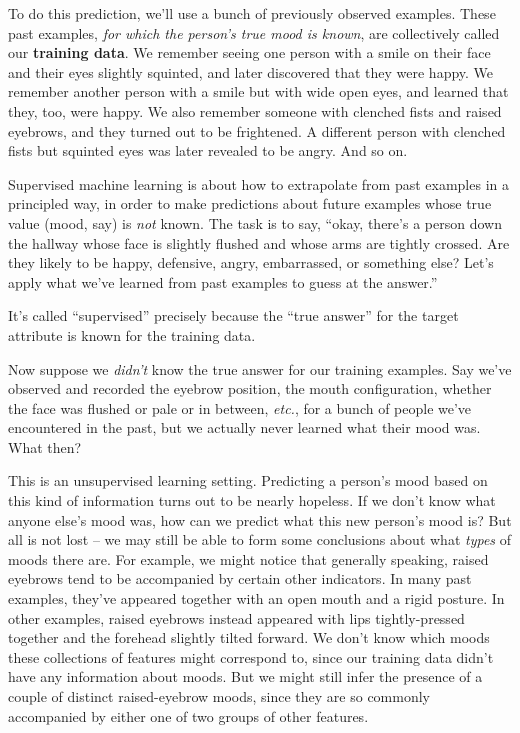 
To do this prediction, we'll use a bunch of previously observed examples. These
past examples, \textit{for which the person's true mood is known}, are
collectively called our \textbf{training data}. We remember seeing one person
with a smile on their face and their eyes slightly squinted, and later
discovered that they were \textsf{happy}. We remember another person with a
smile but with wide open eyes, and learned that they, too, were \textsf{happy}.
We also remember someone with clenched fists and raised eyebrows, and they
turned out to be \textsf{frightened}. A different person with clenched fists
but squinted eyes was later revealed to be \textsf{angry}. And so on.

Supervised machine learning is about how to extrapolate from past examples in a
principled way, in order to make predictions about future examples whose true
value (mood, say) is \textit{not} known. The task is to say, ``okay, there's a
person down the hallway whose face is slightly flushed and whose arms are
tightly crossed. Are they likely to be \textsf{happy}, \textsf{defensive},
\textsf{angry}, \textsf{embarrassed}, or something else? Let's apply what we've
learned from past examples to guess at the answer.''

It's called ``supervised'' precisely because the ``true answer'' for the target
attribute is known for the training data.

Now suppose we \textit{didn't} know the true answer for our training examples.
Say we've observed and recorded the eyebrow position, the mouth configuration,
whether the face was flushed or pale or in between, \textit{etc.}, for a bunch
of people we've encountered in the past, but we actually never learned what
their mood was. What then?

This is an unsupervised learning setting. Predicting a person's mood based on
this kind of information turns out to be nearly hopeless. If we don't know what
anyone else's mood was, how can we predict what this new person's mood is? But
all is not lost -- we may still be able to form some conclusions about what
\textit{types} of moods there are. For example, we might notice that generally
speaking, raised eyebrows tend to be accompanied by certain other indicators.
In many past examples, they've appeared together with an open mouth and a rigid
posture. In other examples, raised eyebrows instead appeared with lips
tightly-pressed together and the forehead slightly tilted forward. We don't
know which moods these collections of features might correspond to, since our
training data didn't have any information about moods. But we might still infer
the presence of a couple of distinct raised-eyebrow moods, since they are so
commonly accompanied by either one of two groups of other features.

